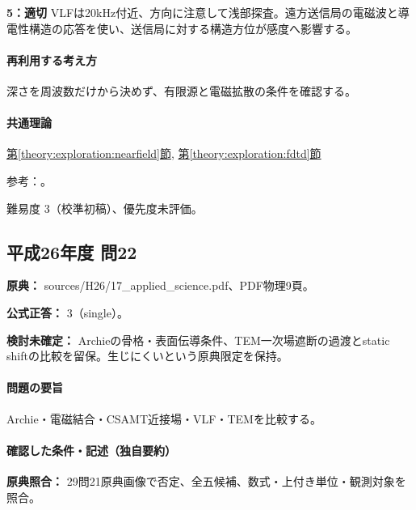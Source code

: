 \noindent\textbf{5：適切} VLFは20kHz付近、方向に注意して浅部探査。遠方送信局の電磁波と導電性構造の応答を使い、送信局に対する構造方位が感度へ影響する。\par

\paragraph{再利用する考え方} 深さを周波数だけから決めず、有限源と電磁拡散の条件を確認する。

\paragraph{共通理論} \hyperref[theory:exploration:nearfield]{第\ref*{theory:exploration:nearfield}節}, \hyperref[theory:exploration:fdtd]{第\ref*{theory:exploration:fdtd}節}

\par 参考：\cite{usgs_csamt2012,epa_tdem_archive,epa_fdem,usgs_mt_metadata}。

\par 難易度 3（校準初稿）、優先度未評価。

\subsection{平成26年度 問22}
\label{q:h26-reg-applied-22}

\noindent\textbf{原典：} sources/H26/17\_applied\_science.pdf、PDF物理9頁。

\textbf{公式正答：} 3（single）。

\par\textbf{検討未確定：} Archieの骨格・表面伝導条件、TEM一次場遮断の過渡とstatic shiftの比較を留保。生じにくいという原典限定を保持。

\paragraph{問題の要旨} Archie・電磁結合・CSAMT近接場・VLF・TEMを比較する。

\paragraph{確認した条件・記述（独自要約）}\mbox{}\par

\noindent\textbf{原典照合：} 29問21原典画像で否定、全五候補、数式・上付き単位・観測対象を照合。\par


